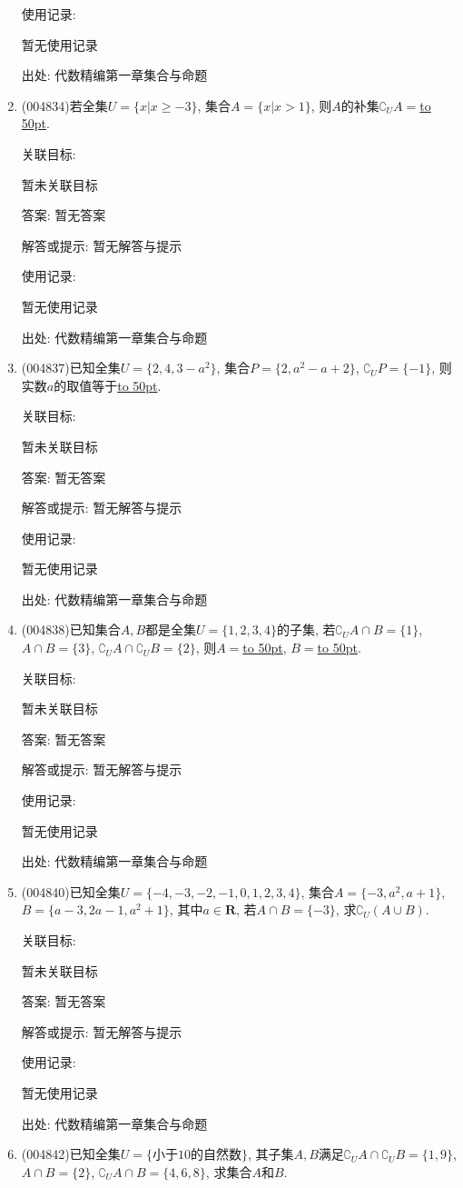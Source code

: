 \documentclass[10pt,a4paper]{article}
\newcommand{\blank}[1]{\underline{\hbox to #1pt{}}}
\begin{document}
\begin{enumerate}[1.]
使用记录:

暂无使用记录


出处: 代数精编第一章集合与命题
\item { (004834)}若全集$U=\{x|x\ge -3\}$, 集合$A=\{x|x>1\}$, 则$A$的补集$\complement_UA=$\blank{50}.


关联目标:

暂未关联目标

答案: 暂无答案

解答或提示: 暂无解答与提示

使用记录:

暂无使用记录


出处: 代数精编第一章集合与命题
\item { (004837)}已知全集$U=\{2,4,3-a^2\}$, 集合$P=\{2,a^2-a+2\}$, $\complement_UP=\{-1\}$, 则实数$a$的取值等于\blank{50}.


关联目标:

暂未关联目标

答案: 暂无答案

解答或提示: 暂无解答与提示

使用记录:

暂无使用记录


出处: 代数精编第一章集合与命题
\item { (004838)}已知集合$A,B$都是全集$U=\{1,2,3,4\}$的子集, 若$\complement_UA\cap B=\{1\}$, $A\cap B=\{3\}$, $\complement_UA\cap \complement_UB=\{2\}$, 则$A=$\blank{50}, $B=$\blank{50}.


关联目标:

暂未关联目标

答案: 暂无答案

解答或提示: 暂无解答与提示

使用记录:

暂无使用记录


出处: 代数精编第一章集合与命题
\item { (004840)}已知全集$U=\{-4,-3,-2,-1,0,1,2,3,4\}$, 集合$A=\{-3,a^2,a+1\}$, $B=\{a-3,2a-1,a^2+1\}$, 其中$a\in \mathbf{R}$, 若$A\cap B=\{-3\}$, 求$\complement_U(A\cup B)$.


关联目标:

暂未关联目标

答案: 暂无答案

解答或提示: 暂无解答与提示

使用记录:

暂无使用记录


出处: 代数精编第一章集合与命题
\item { (004842)}已知全集$U=\{\text{小于}10\text{的自然数}\}$, 其子集$A,B$满足$\complement_UA\cap \complement_UB=\{1,9\}$, $A\cap B=\{2\}$, $\complement_UA\cap B=\{4,6,8\}$, 求集合$A$和$B$.



\end{enumerate}
\end{document}
